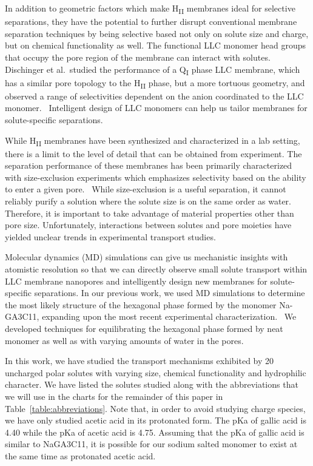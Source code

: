 \documentclass[journal=jpcbfk,manuscript=article]{achemso}
\begin{document}
  In addition to geometric factors which make H\textsubscript{II} membranes
  ideal for selective separations, they have the potential to further disrupt
  conventional membrane separation techniques by being selective based not
  only on solute size and charge, but on chemical functionality as well. 
  The functional LLC monomer head groups that occupy the pore region of the
  membrane can interact with solutes. Dischinger et al.~studied the 
  performance of a Q\textsubscript{I} phase LLC membrane, which has a 
  similar pore topology to the H\textsubscript{II} phase, but a more 
  tortuous geometry, and observed a range of selectivities dependent on the
  anion coordinated to the LLC monomer.~\cite{dischinger_effect_2017} Intelligent 
  design of LLC monomers can help us tailor membranes for solute-specific
  separations.

  While H\textsubscript{II} membranes have been synthesized and characterized
  in a lab setting, there is a limit to the level of detail that can be obtained 
  from experiment. The separation performance of these membranes has been 
  primarily characterized with size-exclusion experiments which emphasizes 
  selectivity based on the ability to enter a given pore.~\cite{zhou_supported_2005}
  While size-exclusion is a useful separation, it cannot reliably purify a 
  solution where the solute size is on the same order as water. Therefore, it is
  important to take advantage of material properties other than pore size. 
  Unfortunately, interactions between solutes and pore moieties have yielded
  unclear trends in experimental transport studies.~\cite{dischinger_effect_2017}

  Molecular dynamics (MD) simulations can give us mechanistic insights with 
  atomistic resolution so that we can directly observe small solute transport
  within LLC membrane nanopores and intelligently design new membranes for 
  solute-specific separations. In our previous work, we used MD simulations to 
  determine the most likely structure of the hexagonal phase formed by the monomer
  Na-GA3C11, expanding upon the most recent experimental characterization.~\cite{coscia_understanding_2018,feng_thin_2016}
  We developed techniques for equilibrating the hexagonal phase formed by neat 
  monomer as well as with varying amounts of water in the pores.

  In this work, we have studied the transport mechanisms exhibited by 20 
  uncharged polar solutes with varying size, chemical functionality and hydrophilic 
  character. We have listed the solutes studied along with the abbreviations that
  we will use in the charts for the remainder of this paper in Table~\ref{table:abbreviations}.
  Note that, in order to avoid studying charge species, we have only studied
  acetic acid in its protonated form. The pKa of gallic acid is 4.40 while the
  pKa of acetic acid is 4.75. Assuming that the pKa of gallic acid is similar 
  to NaGA3C11, it is possible for our sodium salted monomer to exist at the 
  same time as protonated acetic acid.
\end{document}
